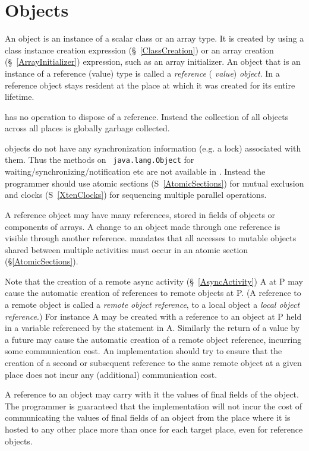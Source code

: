 \section{Objects}\label{XtenObjects}

An object is an instance of a scalar class or an array type. It is
created by using a class instance creation expression
(\S~\ref{ClassCreation}) or an array creation (\S~\ref{ArrayInitializer})
expression, such as an array initializer. An object that is an
instance of a reference (value) type is called a {\em reference} ({\em
value}) {\em object}. In \XtenCurrVer{} a reference object stays
resident at the place at which it was created for its entire lifetime.

{}\Xten{} has no operation to dispose of a reference.  Instead the
collection of all objects across all places is globally garbage
collected.

{}\Xten{} objects do not have any synchronization information (e.g.{}
a lock) associated with them. Thus the methods on {\tt
java.lang.Object} for waiting/synchronizing/notification etc are not
available in \Xten. Instead the programmer should use atomic sections
(S~\ref{AtomicSections}) for mutual exclusion and clocks
(S~\ref{XtenClocks}) for sequencing multiple parallel operations.

A reference object may have many references, stored in fields of
objects or components of arrays. A change to an object made through
one reference is visible through another reference. \Xten{} mandates
that all accesses to mutable objects shared between multiple
activities must occur in an atomic section (\S\ref{AtomicSections}).

Note that the creation of a remote async activity
(\S~\ref{AsyncActivity}) {\cf A} at {\cf P} may cause the automatic creation of
references to remote objects at {\cf P}. (A reference to a remote
object is called a {\em remote object reference}, to a local object a
{\em local object reference}.)  For instance {\cf A} may be created
with a reference to an object at {\cf P} held in a variable referenced
by the statement in {\cf A}.  Similarly the return of a value by a
{\cf future} may cause the automatic creation of a remote object
reference, incurring some communication cost.  An {}\Xten{}
implementation should try to ensure that the creation of a second or
subsequent reference to the same remote object at a given place does
not incur any (additional) communication cost.

A reference to an object may carry with it the values of final fields
of the object. The programmer is guaranteed that the implementation
will not incur the cost of communicating the values of final fields of
an object from the place where it is hosted to any other place more
than once for each target place, even for reference objects.

